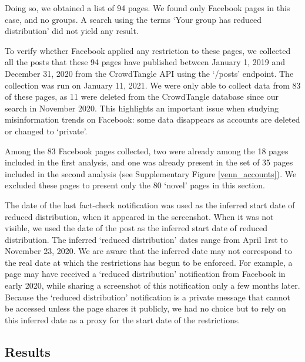 \documentclass[review]{elsarticle}
\begin{document}
{Doing so, we obtained a list of 94 pages. 
We found only Facebook pages in this case, and no groups. 
A search using the terms `Your group has reduced distribution' did not yield any result.

To verify whether Facebook applied any restriction to these pages, we collected all the posts that these 94 pages have published between January 1, 2019 and December 31, 2020 from the CrowdTangle API using the `/posts' endpoint. 
The collection was run on January 11, 2021.
We were only able to collect data from 83 of these pages, as 11 were deleted from the CrowdTangle database since our search in November 2020. 
This highlights an important issue when studying misinformation trends on Facebook: some data disappears as accounts are deleted or changed to ‘private’.

Among the 83 Facebook pages collected, two were already among the 18 pages included in the first analysis, and one was already present in the set of 35 pages included in the second analysis (see Supplementary Figure \ref{venn_accounts}).
We excluded these pages to present only the 80 `novel' pages in this section.

The date of the last fact-check notification was used as the inferred start date of reduced distribution, when it appeared in the screenshot. 
When it was not visible, we used the date of the post as the inferred start date of reduced distribution.
The inferred `reduced distribution' dates range from April 1rst to November 23, 2020.
We are aware that the inferred date may not correspond to the real date at which the restrictions has begun to be enforced.
For example, a page may have received a `reduced distribution' notification from Facebook in early 2020, while sharing a screenshot of this notification only a few months later.
Because the `reduced distribution' notification is a private message that cannot be accessed unless the page shares it publicly, we had no choice but to rely on this inferred date as a proxy for the start date of the restrictions.

\subsection{Results}

}
\end{document}
